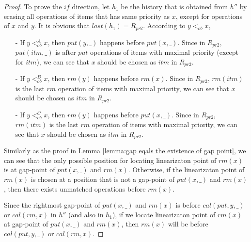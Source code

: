 \begin {proof}

To prove the $\textit{if}$ direction, let $h_1$ be the history that is obtained from $h''$ by erasing all operations of items that has same priority as $x$, except for operations of $x$ and $y$. It is obvious that $\textit{last}(h_1) = R_{\textit{pr2}}$.
According to $y <_{\textit{ob}} x$,

\begin{itemize}
\setlength{\itemsep}{0.5pt}
\item[-] If $y <_{\textit{ob}}^A x$, then $\textit{put}(y,\_)$ happens before $\textit{put}(x,\_)$. Since in $R_{\textit{pr2}}$, $\textit{put}(\textit{itm},\_)$ is after $\textit{put}$ operations of items with maximal priority (except for $\textit{itm}$), we can see that $x$ should be chosen as $\textit{itm}$ in $R_{\textit{pr2}}$.
\item[-] If $y <_{\textit{ob}}^B x$, then $\textit{rm}(y)$ happens before $\textit{rm}(x)$. Since in $R_{\textit{pr2}}$, $\textit{rm}(\textit{itm})$ is the last $\textit{rm}$ operation of items with maximal priority, we can see that $x$ should be chosen as $\textit{itm}$ in $R_{\textit{pr2}}$.

\item[-] If $y <_{\textit{ob}}^C x$, then $\textit{rm}(y)$ happens before $\textit{put}(x,\_)$. Since in $R_{\textit{pr2}}$, $\textit{rm}(\textit{itm})$ is the last $\textit{rm}$ operation of items with maximal priority, we can see that $x$ should be chosen as $\textit{itm}$ in $R_{\textit{pr2}}$.
\end{itemize}



Similarly as the proof in Lemma \ref{lemma:gap eqals the existence of gap point}, we can see that the only possible position for locating linearizaton point of $\textit{rm}(x)$ is at gap-point of $\textit{put}(x,\_)$ and $\textit{rm}(x)$. Otherwise, if the linearizaton point of $\textit{rm}(x)$ is chosen at a position that is not a gap-point of $\textit{put}(x,\_)$ and $\textit{rm}(x)$, then there exists unmatched operations before $\textit{rm}(x)$.

Since the rightmost gap-point of $\textit{put}(x,\_)$ and $\textit{rm}(x)$ is before $\textit{cal}(\textit{put},y,\_)$ or $\textit{cal}(\textit{rm},x)$ in $h''$ (and also in $h_1$), if we locate linearizaton point of $\textit{rm}(x)$ at gap-point of $\textit{put}(x,\_)$ and $\textit{rm}(x)$, then $\textit{rm}(x)$ will be before $\textit{cal}(\textit{put},y,\_)$ or $\textit{cal}(\textit{rm},x)$.


\end{proof}
